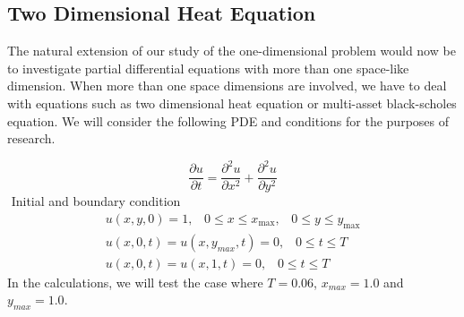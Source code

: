 \documentclass[12pt, oneside]{book}
\theoremstyle{plain}
\theoremstyle{definition}
\begin{document}
\subsection{Two Dimensional Heat Equation}
The natural extension of our study of the one-dimensional problem would now be to investigate partial differential equations with more than one space-like dimension. When more than one space dimensions are involved, we have to deal with equations such as two dimensional heat equation or multi-asset black-scholes equation.  We will consider the following PDE and conditions for the purposes of research.

\begin{equation}
\frac{\partial u}{\partial t} = \frac{\partial^2 u}{\partial x^2} +\frac{\partial^2 u}{\partial y^2}
\end{equation}$  $
Initial and boundary condition
\begin{eqnarray} \label{HeatTwoBase}
u(x,y,0) = 1, \hspace{10pt} 0 \leq x \leq x_{\max}, \hspace{10pt} 0 \leq y \leq y_{\max} \\[10pt]
u(x, 0, t) = u(x, y_{max}, t) = 0, \hspace{10pt} 0 \leq t \leq T \\[10pt]
u(x, 0, t) = u(x, 1, t) = 0 , \hspace{10pt} 0 \leq t \leq T
\end{eqnarray}
In the calculations, we will test the case where $T = 0.06$, $x_{max} = 1.0$ and $y_{max} = 1.0$.
\end{document}
